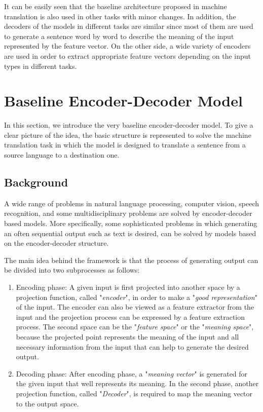 \documentclass[preprint, 12pt]{elsarticle}
\begin{document}
	It can be easily seen that the baseline architecture proposed in machine translation is also used in other tasks with minor changes. In addition, the decoders of the models in different tasks are similar since most of them are used to generate a sentence word by word to describe the meaning of the input represented by the feature  vector. On the other side, a wide variety of encoders are used in order to extract appropriate feature vectors depending on the input types in different tasks. 
	
	\section{Baseline Encoder-Decoder Model}
	In this section, we introduce the very baseline encoder-decoder model. To give a clear picture of the idea, the basic structure is represented to solve the machine translation task in which the model is designed to translate a sentence from a source language to a destination one.  
		\subsection{Background}
		A wide range of problems in natural language processing, computer vision, speech recognition, and some multidisciplinary problems are solved by encoder-decoder based models. More specifically, some sophisticated problems in which generating an often sequential output such as text is desired, can be solved by models based on the encoder-decoder structure. 
		
		The main idea behind the framework is that the process of generating output can be divided into two subprocesses as follows:
		\begin{enumerate}
			\item Encoding phase: A given input is first projected into another space by a projection function, called "\textit{encoder}", in order to make a "\textit{good representation}" of the input. The encoder can also be viewed as a feature extractor from the input and the projection process can be expressed by a feature extraction process. The second space can be the "\textit{feature space}" or the "\textit{meaning space}", because the projected point represents the meaning of the input and all necessary information from the input that can help to generate the desired output.
			\item Decoding phase: After encoding phase, a "\textit{meaning vector}" is generated for the given input that well represents its meaning. In the second phase, another projection function, called "\textit{Decoder}", is required to map the meaning vector to the output space.
		\end{enumerate} 
	
\end{document}
